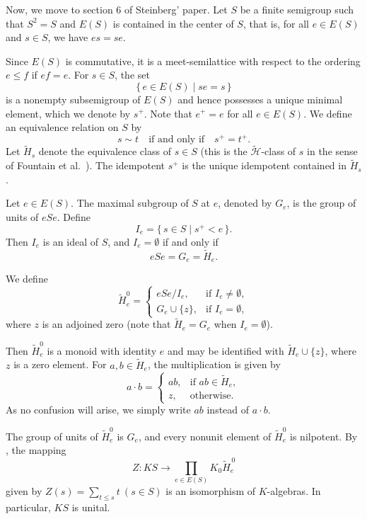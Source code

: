 \documentclass[11pt,reqno]{amsart}
\theoremstyle{plain}
\theoremstyle{remark}
\theoremstyle{definition}
\newcommand{\HH}{\mathrel{\mathscr H}}
\begin{document}

Now, we move to section 6 of Steinberg’ paper.
Let $S$ be a finite semigroup such that $S^2 = S$ and $E(S)$ is contained
in the center of $S$, that is, for all $e \in E(S)$ and $s \in S$, we have
\(es = se\).

Since $E(S)$ is commutative, it is a meet-semilattice with respect to the ordering \(e \leq f\) if $ef = e$.
For $s \in S$, the set
\[
\{\, e \in E(S) \mid se = s \,\}
\]
is a nonempty subsemigroup of $E(S)$ and hence possesses a unique
minimal element, which we denote by $s^{+}$.
Note that $e^{+} = e$ for all $e \in E(S)$.
We define an equivalence relation on $S$ by
\[
s \sim t
\quad \text{if and only if} \quad
s^{+} = t^{+}.
\]
Let $\widetilde{H}_s$ denote the equivalence class of $s \in S$ (this is the $\widetilde{\HH}$-class of $s$ in the sense of Fountain et al.~\cite{Fou-Gom-Gou}).
The idempotent $s^{+}$ is the unique idempotent contained in $\widetilde{H}_s$.

Let $e \in E(S)$. The maximal subgroup of $S$ at $e$,
denoted by $G_e$, is the group of units of $eSe$.
Define
\[
I_e = \{\, s \in S \mid s^{+} < e \,\}.
\]
Then $I_e$ is an ideal of $S$, and $I_e = \emptyset$ if and only if
\[
eSe = G_e = \widetilde{H}_e.
\]

We define
\[
\widetilde{H}_e^{0} =
\begin{cases}
eSe/I_e, & \text{if } I_e \neq \emptyset, \\[0.8ex]
G_e \cup \{z\}, & \text{if } I_e = \emptyset,
\end{cases}
\]
where $z$ is an adjoined zero (note that $\widetilde{H}_e = G_e$
when $I_e = \emptyset$).

Then $\widetilde{H}_e^{0}$ is a monoid with identity $e$ and may be
identified with $\widetilde{H}_e \cup \{z\}$, where $z$ is a zero
element. For $a,b \in \widetilde{H}_e$, the multiplication is given by
\[
a \cdot b =
\begin{cases}
ab, & \text{if } ab \in \widetilde{H}_e, \\[0.6ex]
z, & \text{otherwise}.
\end{cases}
\]
As no confusion will arise, we simply write $ab$ instead of
$a \cdot b$.

The group of units of $\widetilde{H}_e^{0}$ is $G_e$, and every
nonunit element of $\widetilde{H}_e^{0}$ is nilpotent. 
By \cite[Theorem 6.5]{Ste-Fac-det}, the mapping
\begin{equation}\label{Thm6.5}
Z : KS \longrightarrow \prod_{e \in E(S)}K_0 \widetilde{H}_e^{\,0}
\end{equation}
given by \(Z(s) = \sum_{t \le s} t\ (s \in S)\)
is an isomorphism of $K$-algebras. In particular, $KS$ is unital.
\end{document}

